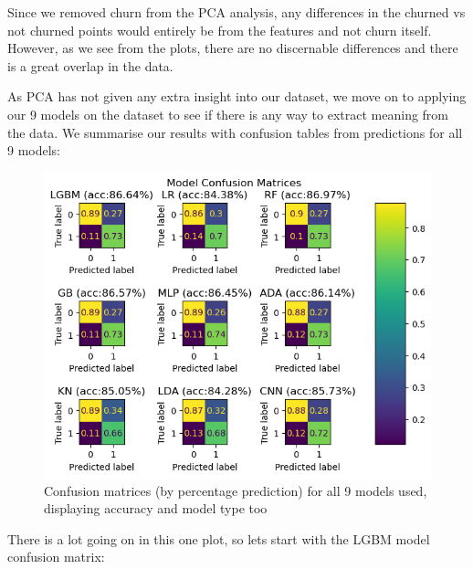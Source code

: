 \documentclass[]{article}
\begin{document}
Since we removed churn from the PCA analysis, any differences in the churned vs not churned points would entirely be from the features and not churn itself. However, as we see from the plots, there are no discernable differences and there is a great overlap in the data. 

As PCA has not given any extra insight into our dataset, we move on to applying our 9 models on the dataset to see if there is any way to extract meaning from the data. We summarise our results with confusion tables from predictions for all 9 models:

\begin{figure}[h!]
	\centering
	\includegraphics[scale=0.6]{9cm}
	\caption{Confusion matrices (by percentage prediction) for all 9 models used, displaying accuracy and model type too}
\end{figure}

There is a lot going on in this one plot, so lets start with the LGBM model confusion matrix:
\end{document}

